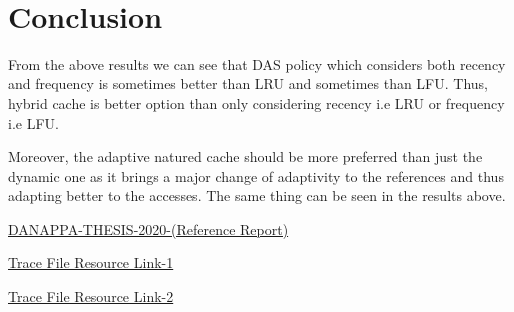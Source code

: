\documentclass[conference]{IEEEtran}
\begin{document}
\\
\newpage
\section{\textbf{Conclusion}}

From the above results we can see that DAS policy which considers both recency and frequency is sometimes better than LRU and sometimes than LFU. Thus, hybrid cache is better option than only considering recency i.e LRU or frequency i.e LFU.  

Moreover, the adaptive natured cache should be more preferred than just the dynamic one as it brings a major change of adaptivity to the references and thus adapting better to the accesses. The same thing can be seen in the results above. 

\begin{thebibliography}{00}

 \href{https://drive.google.com/file/d/1oDsIjIyG2wDHd52hKxKYRgiID0IYgg_g/view?usp=sharing}{DANAPPA-THESIS-2020-(Reference Report)}

 \href{http://www.cs.toronto.edu/~reid/csc150/02f/a2/traces.html}{Trace File Resource Link-1}

 \href{https://cseweb.ucsd.edu/classes/fa07/cse240a/project1.html}{Trace File Resource Link-2}
\end{thebibliography}
\end{document}
